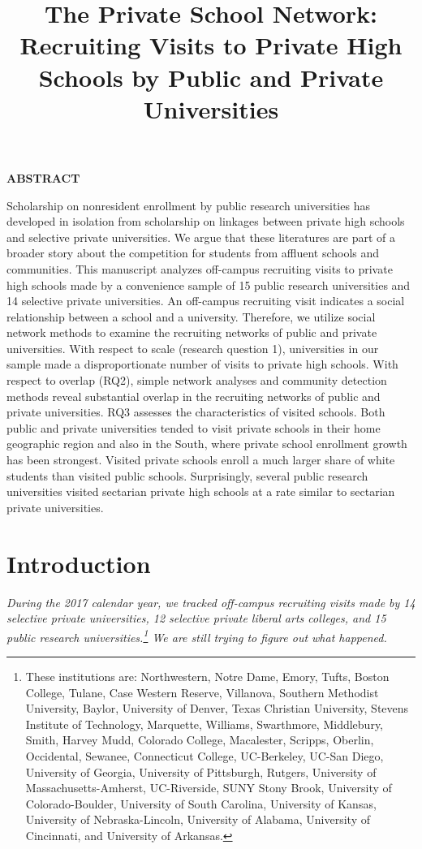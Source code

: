 \documentclass[
  12pt,
]{article}
\title{The Private School Network: Recruiting Visits to Private High Schools by Public and Private Universities}
\author{}
\date{\vspace{-2.5em}}
\begin{document}
\maketitle


\textbf{ABSTRACT}

Scholarship on nonresident enrollment by public research universities has developed in isolation from scholarship on linkages between private high schools and selective private universities. We argue that these literatures are part of a broader story about the competition for students from affluent schools and communities. This manuscript analyzes off-campus recruiting visits to private high schools made by a convenience sample of 15 public research universities and 14 selective private universities. An off-campus recruiting visit indicates a social relationship between a school and a university. Therefore, we utilize social network methods to examine the recruiting networks of public and private universities. With respect to scale (research question 1), universities in our sample made a disproportionate number of visits to private high schools. With respect to overlap (RQ2), simple network analyses and community detection methods reveal substantial overlap in the recruiting networks of public and private universities. RQ3 assesses the characteristics of visited schools. Both public and private universities tended to visit private schools in their home geographic region and also in the South, where private school enrollment growth has been strongest. Visited private schools enroll a much larger share of white students than visited public schools. Surprisingly, several public research universities visited sectarian private high schools at a rate similar to sectarian private universities.

\newpage
{}

\hypertarget{introduction}{%
\section{Introduction}\label{introduction}}

\emph{During the 2017 calendar year, we tracked off-campus recruiting visits made by 14 selective private universities, 12 selective private liberal arts colleges, and 15 public research universities.\footnote{These institutions are: Northwestern, Notre Dame, Emory, Tufts, Boston College, Tulane, Case Western Reserve, Villanova, Southern Methodist University, Baylor, University of Denver, Texas Christian University, Stevens Institute of Technology, Marquette, Williams, Swarthmore, Middlebury, Smith, Harvey Mudd, Colorado College, Macalester, Scripps, Oberlin, Occidental, Sewanee, Connecticut College, UC-Berkeley, UC-San Diego, University of Georgia, University of Pittsburgh, Rutgers, University of Massachusetts-Amherst, UC-Riverside, SUNY Stony Brook, University of Colorado-Boulder, University of South Carolina, University of Kansas, University of Nebraska-Lincoln, University of Alabama, University of Cincinnati, and University of Arkansas.} We are still trying to figure out what happened.}
\end{document}
